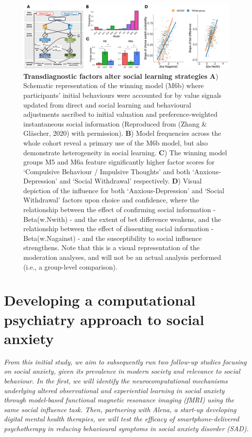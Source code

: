 \documentclass[12pt,a4paper,oneside,]{book} %
\begin{document}
\begin{figure}
\includegraphics[width=1\linewidth]{figures/predicted_results} \caption{{\textbf{Transdiagnostic factors alter social learning strategies} \textbf{A}) Schematic representation of the winning model (M6b) where participants' initial behaviours were accounted for by value signals updated from direct and social learning and behavioural adjustments ascribed to initial valuation and preference-weighted instantaneous social information (Reproduced from (Zhang \& Gläscher, 2020) with permission). \textbf{B}) Model frequencies across the whole cohort reveal a primary use of the M6b model, but also demonstrate heterogeneity in social learning. \textbf{C}) The winning model groups M5 and M6a feature significantly higher factor scores for `Compulsive Behaviour / Impulsive Thoughts' and both `Anxious-Depression' and `Social Withdrawal' respectively. \textbf{D}) Visual depiction of the influence for both `Anxious-Depression' and `Social Withdrawal' factors upon choice and confidence, where the relationship between the effect of confirming social information - Beta(w.Nwith) - and the extent of bet difference weakens, and the relationship between the effect of dissenting social information - Beta(w.Nagainst) - and the susceptibility to social influence strengthens. Note that this is a visual representation of the moderation analyses, and will not be an actual analysis performed (i.e., a group-level comparison).}}\label{fig:figure-5-results}
\end{figure}



\chapter{Developing a computational psychiatry approach to social anxiety}\label{developing-a-computational-psychiatry-approach-to-social-anxiety}

\chaptermark{}

\noindent  \emph{From this initial study, we aim to subsequently run two follow-up studies focusing on social anxiety, given its prevalence in modern society and relevance to social behaviour. In the first, we will identify the neurocomputational mechanisms underlying altered observational and experiential learning in social anxiety through model-based functional magnetic resonance imaging (fMRI) using the same social influence task. Then, partnering with Alena, a start-up developing digital mental health therapies, we will test the efficacy of smartphone-delivered psychotherapy in reducing behavioural symptoms in social anxiety disorder (SAD).}
\end{document}

